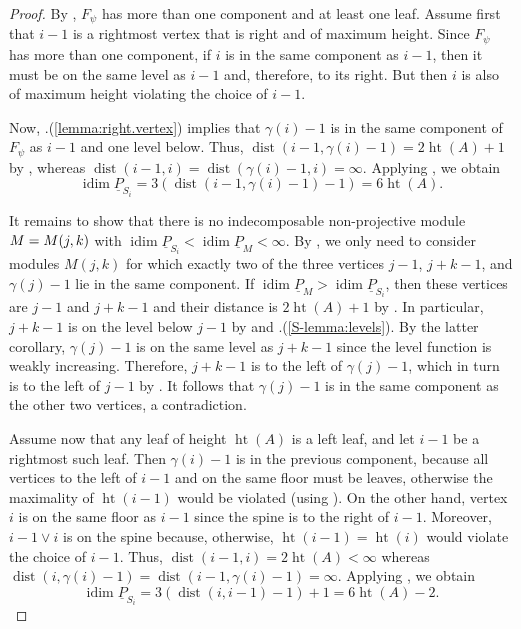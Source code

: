 \documentclass[a4paper]{amsart}
\theoremstyle{definition}
\theoremstyle{remark}
\numberwithin{equation}{theorem}
\newcommand{\pstab}[1]{\underline{P}_{#1}}
\newcommand{\height}{\operatorname{ht}}
\newcommand{\idim}{\operatorname{idim}}
\newcommand{\dist}{\operatorname{dist}}
\newcommand{\psiforest}{F_\psi}
\begin{document}
\begin{proof}
  By , $\psiforest$ has more than one component and at least one leaf.  Assume first that $i-1$ is a rightmost vertex that is right and of maximum height.
  Since $\psiforest$ has more than one component, if $ i $ is in the same component as $ i-1 $, then it must be on the same level as $i-1$ and, therefore, to its right. But then $ i $ is also of maximum height violating the choice of $ i-1 $.

  Now, .(\ref{lemma:right.vertex}) implies that $\gamma(i)-1$ is
  in the same component of $ \psiforest $ as $i-1$ and one level below.
    Thus, $ \dist(i-1,\gamma(i)-1)=2 \height(A)+1$ by , whereas
  $\dist(i-1, i) = \dist(\gamma(i)-1, i) = \infty$.
  Applying
  , we obtain
  \[
    \idim\pstab{S_i} %
    = 3(\dist(i-1, \gamma(i)-1)-1) %
    = 6\height(A).
  \]

  It remains to show that there is no indecomposable non-projective module $M = \mik[j]$ with $\idim \pstab{S_i} < \idim \pstab{M} < \infty$.
  By , we only need to consider modules $M(j,k)$ for which
  exactly two of the three vertices $j-1$,
  $j+k-1$, and $\gamma(j)-1$ lie in the same component.
    If $\idim \pstab{M} > \idim \pstab{S_i}$, then these vertices are $ j-1 $ and $ j+k-1 $ and their distance is $2\height(A) + 1$ by . In particular, $ j+k-1 $ is on the level below $ j-1 $ by  and .(\ref{S-lemma:levels}).
    By the latter corollary, $ \gamma(j)-1 $ is on the same level as $ j+k-1 $ since the level function is weakly increasing. Therefore, $ j+k-1 $ is to the left of $ \gamma(j)-1 $, which in turn is to the left of $ j-1 $ by . It follows that $ \gamma(j)-1 $ is in the same component as the other two vertices, a contradiction.


  Assume now that any leaf of height $\height(A)$ is a left
  leaf, and let $i-1$ be a rightmost such leaf.
  Then $\gamma(i)-1$ is in the previous component, because all
  vertices to the left of $i-1$ and on the same floor must be leaves, otherwise the maximality of $ \height(i-1) $ would be violated
  (using ).
  On the other hand, vertex $i$ is on the same floor as $i-1$ since the spine is to the right of $i-1$.
  Moreover, $i-1\vee i$ is
  on the spine because, otherwise, $\height(i-1)=\height(i)$ would violate the choice of $ i-1 $.
    Thus, $\dist(i-1, i) = 2\height(A) < \infty$ whereas
  $\dist(i, \gamma(i)-1) = \dist(i-1, \gamma(i)-1) = \infty$. Applying
  , we obtain
  \[
    \idim\pstab{S_i} %
    = 3(\dist(i, i-1)-1)+1 %
    = 6\height(A) - 2.
  \]


\end{proof}
\end{document}
